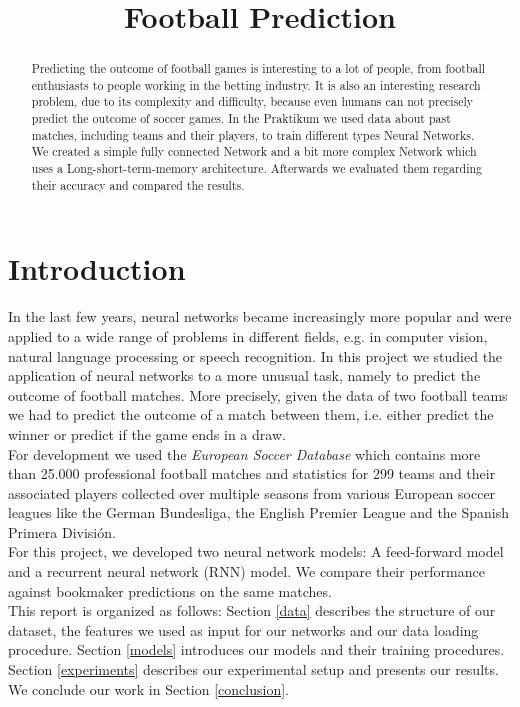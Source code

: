 \documentclass[a4paper]{article}
\title{Football Prediction}
\begin{document}
\maketitle
%
\begin{abstract}
Predicting the outcome of football games is interesting to a lot of people, from
football enthusiasts to people working in the betting industry. It is also an
interesting research problem, due to its complexity and difficulty, because even
humans can not precisely predict the outcome of soccer games. In the Praktikum
we used data about past matches, including teams and their players, to train
different types Neural Networks. We created a simple fully connected Network and
a bit more complex Network which uses a Long-short-term-memory architecture.
Afterwards we evaluated them regarding their accuracy and compared the results.
\end{abstract}
%
\section{Introduction}
In the last few years, neural networks became increasingly more popular and were
applied to a wide range of problems in different fields, e.g. in computer
vision, natural language processing or speech recognition. In this project we
studied the application of neural networks to a more unusual task, namely to
predict the outcome of football matches. More precisely, given the data of two
football teams we had to predict the outcome of a match between them, i.e.
either predict the winner or predict if the game ends in a draw. \\
For development we used the \emph{European Soccer Database} \cite{1} which
contains more than 25.000 professional football matches and statistics for 299
teams and their associated players collected over multiple seasons from various
European soccer leagues like the German Bundesliga, the English Premier League
and the Spanish Primera División. \\
For this project, we developed two neural network models: A feed-forward model
and a recurrent neural network (RNN) model. We compare their performance against
bookmaker predictions on the same matches. \\
This report is organized as follows: Section \ref{data} describes the structure
of our dataset, the features we used as input for our networks and our data
loading procedure. Section \ref{models} introduces our  models and their
training procedures. Section \ref{experiments} describes our experimental setup
and presents our results. We conclude our work in Section \ref{conclusion}.
\end{document}
